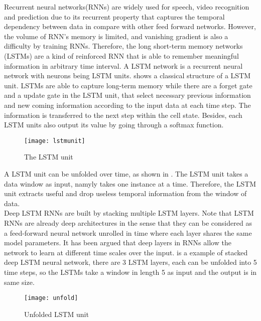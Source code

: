 Recurrent neural networks(RNNs) are widely used for speech, video recognition and prediction due to its recurrent property that captures the temporal dependency between data in compare with other feed forward networks. However, the volume of RNN’s memory is limited, and vanishing gradient is also a difficulty by training RNNs. Therefore, the long short-term memory networks (LSTMs) are a kind of reinforced RNN that is able to remember meaningful information in arbitrary time interval. A LSTM network is a recurrent neural network with neurons being LSTM units.  shows a classical structure of a LSTM unit. LSTMs are able to capture long-term memory while there are a forget gate and a update gate in the LSTM unit, that select necessary previous information and new coming information according to the input data at each time step. The information is transferred to the next step within the cell state. Besides, each LSTM units also output its value by going through a softmax function.

\begin{figure}[ht]
\centering
\texttt{[image: lstmunit]}
\caption[LSTM unit]{The LSTM unit}
\label{fig:lstmunit}
\end{figure}


A LSTM unit can be unfolded over time, as shown in . The LSTM unit takes a data window as input, namyly takes one instance at a time. Therefore, the LSTM unit extracts useful and drop useless temporal information from the window of data.\\


Deep LSTM RNNs are built by stacking multiple LSTM layers. Note that LSTM RNNs are already deep architectures in the sense that they can be considered as a feed-forward neural network unrolled in time where each layer shares the same model parameters. It has been argued that deep layers in RNNs allow the network to learn at different time scales over the input\cite{deep}.  is a example of stacked deep LSTM neural network, there are 3 LSTM layers, each can be unfolded into 5 time steps, so the LSTMs take a window in length 5 as input and the output is in same size.

\begin{figure}[h]
\centering
\texttt{[image: unfold]}
\caption[Unfolded LSTM unit]{Unfolded LSTM unit}
\label{fig:unfolded}
\end{figure}

